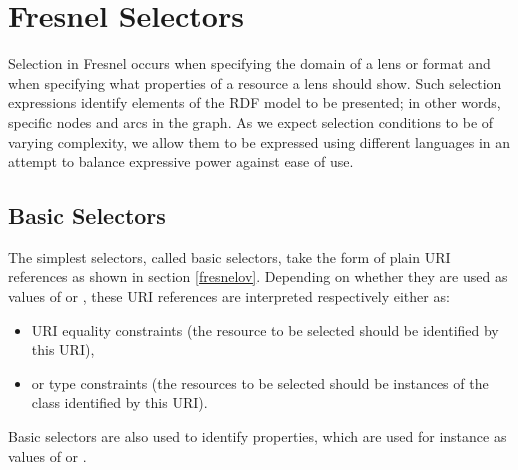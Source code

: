 \section{Fresnel Selectors}
\label{selectors}

Selection in Fresnel occurs when specifying the domain of a lens or format and when specifying what properties of a resource a lens should show. Such selection expressions identify elements of the RDF model to be presented; in other words, specific nodes and arcs in the graph. As we expect selection conditions to be of varying complexity, we allow them to be expressed using different languages in an attempt to balance expressive power against ease of use.

\subsection{Basic Selectors}

The simplest selectors, called basic selectors, take the form of plain URI references as shown in section \ref{fresnelov}. Depending on whether they are used as values of  or , these URI references are interpreted respectively either as:
\begin{itemize}
\item URI equality constraints (the resource to be selected should be identified by this URI),
\item or type constraints (the resources to be selected should be instances of the class identified by this URI).
\end{itemize}

Basic selectors are also used to identify properties, which are used for instance as values of  or .


